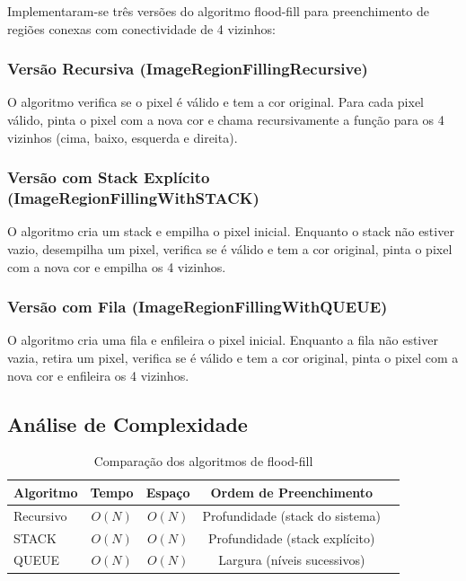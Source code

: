 \documentclass[12pt,a4paper]{article}
\begin{document}
Implementaram-se três versões do algoritmo flood-fill para preenchimento de regiões conexas com conectividade de 4 vizinhos:

\subsubsection{Versão Recursiva (ImageRegionFillingRecursive)}

O algoritmo verifica se o pixel é válido e tem a cor original. Para cada pixel válido, pinta o pixel com a nova cor e chama recursivamente a função para os 4 vizinhos (cima, baixo, esquerda e direita).

\subsubsection{Versão com Stack Explícito (ImageRegionFillingWithSTACK)}

O algoritmo cria um stack e empilha o pixel inicial. Enquanto o stack não estiver vazio, desempilha um pixel, verifica se é válido e tem a cor original, pinta o pixel com a nova cor e empilha os 4 vizinhos.

\subsubsection{Versão com Fila (ImageRegionFillingWithQUEUE)}

O algoritmo cria uma fila e enfileira o pixel inicial. Enquanto a fila não estiver vazia, retira um pixel, verifica se é válido e tem a cor original, pinta o pixel com a nova cor e enfileira os 4 vizinhos. 

\subsection{Análise de Complexidade}

\begin{table}[h]
\centering
\begin{tabular}{|l|c|c|c|c|}
\hline
\textbf{Algoritmo} & \textbf{Tempo} & \textbf{Espaço} & \textbf{Ordem de Preenchimento} \\
\hline
Recursivo & $O(N)$ & $O(N)$  & Profundidade (stack do sistema) \\
STACK & $O(N)$ & $O(N)$  & Profundidade (stack explícito) \\
QUEUE & $O(N)$ & $O(N)$ & Largura (níveis sucessivos)

 \\
\hline
\end{tabular}
\caption{Comparação dos algoritmos de flood-fill}
\end{table}
\end{document}
